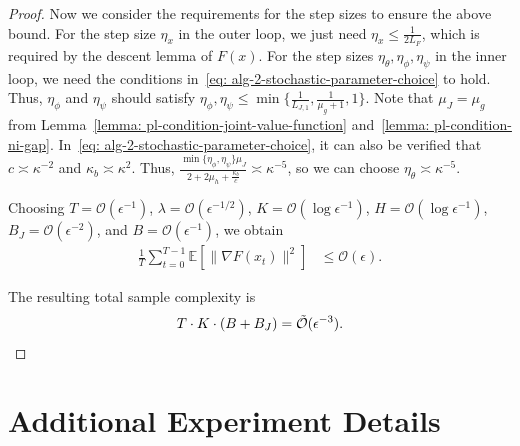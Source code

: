 \documentclass{article}
\theoremstyle{plain}
\theoremstyle{definition}
\theoremstyle{remark}
\def\E{\mathbb E}
\begin{document}
\begin{proof}
    Now we consider the requirements for the step sizes to ensure the above bound. For the step size $\eta_x$ in the outer loop, we just need $\eta_x \leq \frac{1}{2L_F}$, which is required by the descent lemma of $F(x)$. 
    For the step sizes $\eta_\theta, \eta_\phi, \eta_\psi$ in the inner loop, we need the conditions in~\eqref{eq: alg-2-stochastic-parameter-choice} to hold. Thus, $\eta_\phi$ and $\eta_\psi$ should satisfy $\eta_\phi, \eta_\psi \leq \min \{\frac{1}{L_{J,1}}, \frac{1}{\mu_g + 1}, 1 \}$. Note that $\mu_J = \mu_g$ from Lemma~\ref{lemma: pl-condition-joint-value-function} and~\ref{lemma: pl-condition-ni-gap}. In~\eqref{eq: alg-2-stochastic-parameter-choice}, it can also be verified that $c \asymp \kappa^{-2}$ and $\kappa_b \asymp \kappa^2$. Thus, $\frac{\min\{\eta_\phi,\eta_\psi\} \mu_J}{2+ 2 \mu_h + \frac{\kappa_b}{c}} \asymp \kappa^{-5}$, so we can choose $\eta_\theta \asymp \kappa^{-5}$.  

Choosing $T = \mathcal{O}(\epsilon^{-1})$,
$\lambda = \mathcal{O}(\epsilon^{-1/2})$,
$K = \mathcal{O}(\log \epsilon^{-1})$,
$H = \mathcal{O}(\log \epsilon^{-1})$,
$B_J = \mathcal{O}(\epsilon^{-2})$, and
$B = \mathcal{O}(\epsilon^{-1})$, we obtain
\begin{align}
    \frac{1}{T}\sum_{t=0}^{T-1}
    \E \left[ \|\nabla F(x_t)\|^2 \right]
    & \leq \mathcal{O}(\epsilon).
\end{align}

The resulting total sample complexity is
\begin{align}
    T \cdot K \cdot (B + B_J)
    =
    \tilde{\mathcal{O}}(\epsilon^{-3}).
    \notag
\end{align}
\end{proof}



\clearpage
\newpage
\section{Additional Experiment Details}
\label{appendix: experiment-details}
\end{document}
